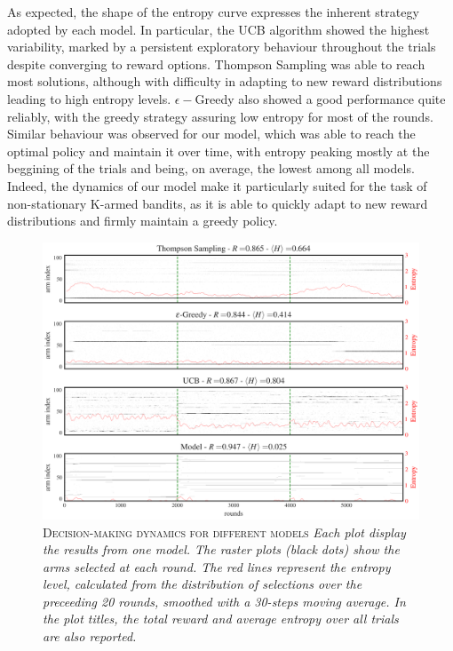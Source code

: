 As expected, the shape of the entropy curve expresses the inherent strategy adopted by each model.
In particular, the UCB algorithm showed the highest variability, marked by a persistent exploratory behaviour throughout the trials despite converging to reward options. Thompson Sampling was able to reach most solutions, although with difficulty in adapting to new reward distributions
leading to high entropy levels.
$\epsilon-$Greedy also showed a good performance quite reliably, with the greedy strategy assuring low entropy for most of the rounds.
Similar behaviour was observed for our model, which was able to reach the optimal policy and maintain it over time, with entropy peaking mostly at the beggining of the trials and being, on average, the lowest among all models.
Indeed, the dynamics of our model make it particularly suited for the task of non-stationary K-armed bandits, as it is able to quickly adapt to new reward distributions and firmly maintain a greedy policy.

\begin{figure}[H]
    \centering
    \includegraphics[width=1.0\textwidth]{figures/performance_analysis_v0_1.png}
    \caption{\textsc{Decision-making dynamics for different models} \textit{Each plot display the results from one model. The raster plots (black dots) show the arms selected at each round.
The red lines represent the entropy level, calculated from the distribution of selections over the preceeding 20 rounds, smoothed with a 30-steps moving average. In the plot titles, the total reward and average entropy over all trials are also reported.}}
    \label{fig:entropy_fig1}
\end{figure}


